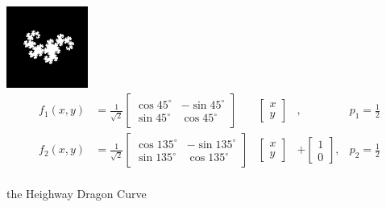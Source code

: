 \documentclass[11pt]{article}
\begin{document}
\begin{ifs}
\centering
\includegraphics[width=0.2\textwidth]{figures/dragon_curve}
$$ 
\begin{aligned}
f_1(x,y) &= \frac{1}{\sqrt{2}}\begin{bmatrix} \cos 45^\circ & -\sin 45^\circ \\ \sin 45^\circ & \cos 45^\circ \end{bmatrix} & \begin{bmatrix} x \\ y \end{bmatrix} & , &p_1 = \frac{1}{2} \\
f_2(x,y) &= \frac{1}{\sqrt{2}}\begin{bmatrix} \cos 135^\circ & -\sin 135^\circ \\ \sin 135^\circ & \cos 135^\circ \end{bmatrix} & \begin{bmatrix} x \\ y \end{bmatrix} &+ \begin{bmatrix} 1 \\ 0 \end{bmatrix} , &p_2 = \frac{1}{2} \\
\end{aligned}
$$

\caption{the Heighway Dragon Curve}
\label{ifs:dragon_curve}
\end{ifs}
\end{document}
